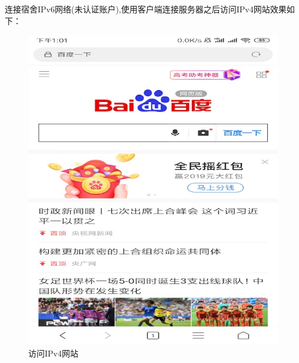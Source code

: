 \newpage
连接宿舍IPv6网络(未认证账户),使用客户端连接服务器之后访问IPv4网站效果如下：
\begin{figure}[!ht]
	\begin{center}
	\includegraphics[scale=.58]{baidu.jpeg}
	\end{center}
	\caption{访问IPv4网站}
	\label{figure:访问IPv4网站}
\end{figure}